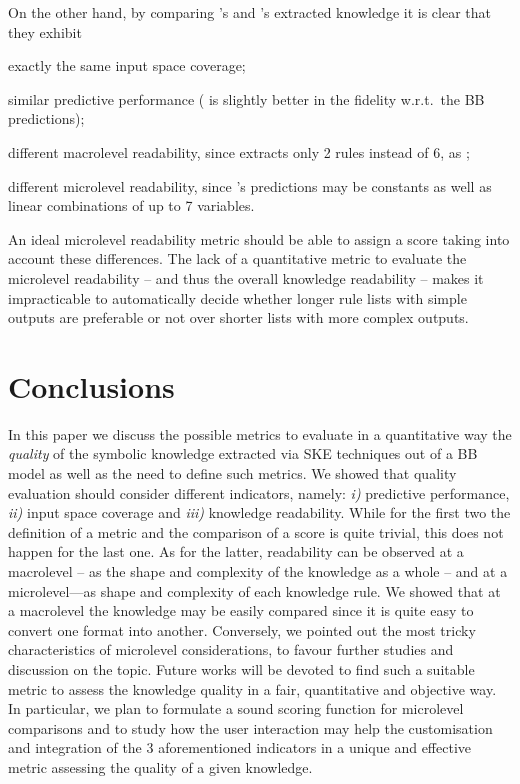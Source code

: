 \documentclass[sigconf]{acmart}
\begin{document}
On the other hand, by comparing \cart{}'s and \creepy{}'s extracted knowledge it is clear that they exhibit
%
\begin{inlinelist}
	\item exactly the same input space coverage;
	\item similar predictive performance (\creepy{} is slightly better in the fidelity w.r.t.\ the BB predictions);
	\item different macrolevel readability, since \creepy{} extracts only 2 rules instead of 6, as \cart{};
	\item different microlevel readability, since \creepy{}'s predictions may be constants as well as linear combinations of up to 7 variables.
\end{inlinelist} 
%
An ideal microlevel readability metric should be able to assign a score taking into account these differences.
%
The lack of a quantitative metric to evaluate the microlevel readability -- and thus the overall knowledge readability -- makes it impracticable to automatically decide whether longer rule lists with simple outputs are preferable or not over shorter lists with more complex outputs.

\section{Conclusions}

In this paper we discuss the possible metrics to evaluate in a quantitative way the \emph{quality} of the symbolic knowledge extracted via SKE techniques out of a BB model as well as the need to define such metrics.
%
We showed that quality evaluation should consider different indicators, namely: \textit{i)} predictive performance, \textit{ii)} input space coverage and \textit{iii)} knowledge readability.
%
While for the first two the definition of a metric and the comparison of a score is quite trivial, this does not happen for the last one.
%
As for the latter, readability can be observed at a macrolevel -- as the shape and complexity of the knowledge as a whole -- and at a microlevel---as shape and complexity of each knowledge rule.
%
We showed that at a macrolevel the knowledge may be easily compared since it is quite easy to convert one format into another.
%
Conversely, we pointed out the most tricky characteristics of microlevel considerations, to favour further studies and discussion on the topic.
%
Future works will be devoted to find such a suitable metric to assess the knowledge quality in a fair, quantitative and objective way.
%
In particular, we plan to formulate a sound scoring function for microlevel comparisons and to study how the user interaction may help the customisation and integration of the 3 aforementioned indicators in a unique and effective metric assessing the quality of a given knowledge.
\end{document}
